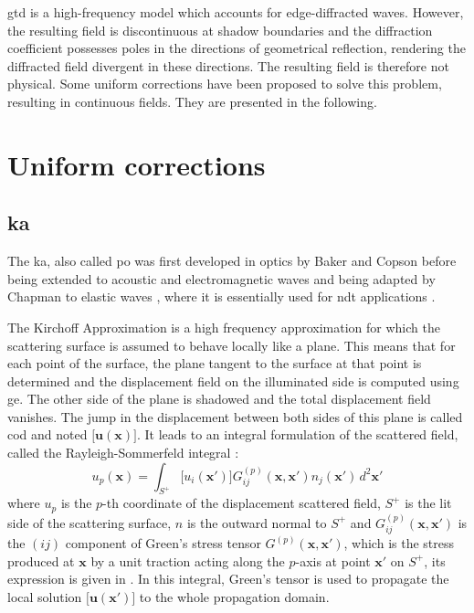 \acrshort{gtd} is a high-frequency model which accounts for edge-diffracted waves. However, the resulting field is discontinuous at shadow boundaries and the diffraction coefficient possesses poles in the directions of geometrical reflection, rendering the diffracted field divergent in these directions. The resulting field is therefore not physical. Some uniform corrections have been proposed to solve this problem, resulting in continuous fields. They are presented in the following. 

\section{Uniform corrections}
\label{sectUnif}
\subsection{\acrfull{ka}}
\label{sectKA}
The \acrfull{ka}, also called \acrfull{po} was first developed in optics by Baker and Copson \cite{POoptics} before being extended to acoustic and electromagnetic waves \cite{POtechreport, POLewis} and being adapted by Chapman to elastic waves \cite{POChapman}, where it is essentially used for \acrshort{ndt} applications \cite{Schmerr,Dorval}.

The Kirchoff Approximation is a high frequency approximation for which the scattering surface is assumed to behave locally like a plane. This means that for each point of the surface, the plane tangent to the surface at that point is determined and the displacement field on the illuminated side is computed using \acrshort{ge}. The other side of the plane is shadowed and the total displacement field vanishes. The jump in the displacement between both sides of this plane is called \acrfull{cod} and noted $\lbrack \mathbf{u}(\mathbf{x}) \rbrack$. It leads to an integral formulation of the scattered field, called the Rayleigh-Sommerfeld integral \cite{POChapman} :
\begin{equation}
u_p(\mathbf{x})=\int_{S^+}\lbrack u_i(\mathbf{x'})\rbrack G_{ij}^{(p)}(\mathbf{x},\mathbf{x'})n_j(\mathbf{x'})\,d^2\mathbf{x'}
\label{intKA}
\end{equation}
where $u_p$ is the $p$-th coordinate of the displacement scattered field, $S^+$ is the lit side of the scattering surface, $n$ is the outward normal to $S^+$ and $G_{ij}^{(p)}(\mathbf{x},\mathbf{x'})$ is the $(ij)$ component of Green's stress tensor $G^{(p)}(\mathbf{x},\mathbf{x'})$, which is the stress produced at $\mathbf{x}$ by a unit traction acting along the $p$-axis at point $\mathbf{x'}$ on $S^+$, its expression is given in \cite{POChapman}. In this integral, Green's tensor is used to propagate the local solution $\lbrack \mathbf{u}(\mathbf{x'}) \rbrack$ to the whole propagation domain.

